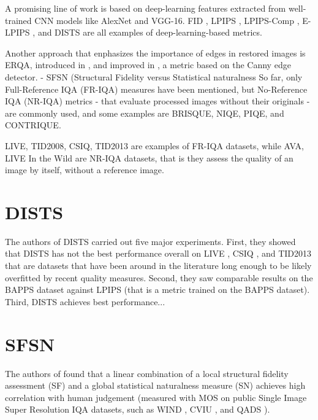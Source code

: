 A promising line of work is based on deep-learning features extracted from well-trained CNN models like AlexNet and VGG-16.
FID \cite{heusel2017gans}, LPIPS \cite{zhang2018unreasonable}, LPIPS-Comp \cite{patel2021saliency}, E-LPIPS \cite{kettunen2019lpips}, and DISTS \cite{ding2020image} are all examples of deep-learning-based metrics.

Another approach that enphasizes the importance of edges in restored images is ERQA, introduced in \cite{kirillova2021erqa}, and improved in \cite{lyapustin2022towards}, a metric based on the Canny edge detector.
- SFSN (Structural Fidelity versus Statistical naturalness \cite{zhou2021image}
So far, only Full-Reference IQA (FR-IQA) measures have been mentioned, but No-Reference IQA (NR-IQA) metrics - that evaluate processed images without their originals - are commonly used, and some examples are BRISQUE, NIQE, PIQE, and CONTRIQUE.


LIVE, TID2008, CSIQ, TID2013 are examples of FR-IQA datasets, while AVA, LIVE In the Wild are NR-IQA datasets, that is they assess the quality of an image by itself, without a reference image.






\section{DISTS}
\label{sec:dists}
The authors of DISTS \cite{} carried out five major experiments. First, they showed that DISTS has not the best performance overall on LIVE \cite{}, CSIQ \cite{}, and TID2013 \cite{} that are datasets that have been around in the literature long enough to be likely overfitted by recent quality measures. Second, they saw comparable results on the BAPPS dataset against LPIPS (that is a metric trained on the BAPPS dataset). Third, DISTS achieves best performance...

\section{SFSN}
\label{sec:sfsn}
The authors of \cite{zhou2021image} found that a linear combination of a local structural fidelity assessment (SF) and a global statistical naturalness measure (SN) achieves high correlation with human judgement (measured with MOS on public Single Image Super Resolution IQA datasets, such as WIND \cite{yeganeh2015objective}, CVIU \cite{ma2017learning}, and QADS \cite{zhou2019visual}).

